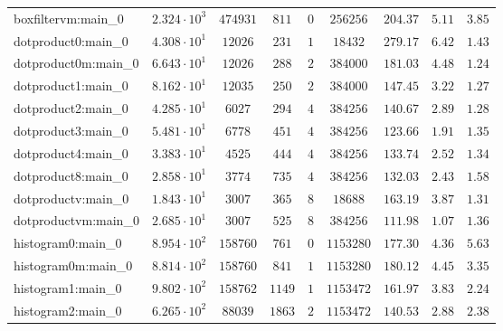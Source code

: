 \begin{tabular}{|l|c|c|c|c|c|c|c|c|}
boxfiltervm:main\_0            & $ 2.324 \cdot 10^{3} $ & $ 474931   $ & $ 811    $ & $ 0    $ & $ 256256   $ & $ 204.37      $ & $ 5.11    $ & $ 3.85    $ \\
dotproduct0:main\_0            & $ 4.308 \cdot 10^{1} $ & $ 12026    $ & $ 231    $ & $ 1    $ & $ 18432    $ & $ 279.17      $ & $ 6.42    $ & $ 1.43    $ \\
dotproduct0m:main\_0           & $ 6.643 \cdot 10^{1} $ & $ 12026    $ & $ 288    $ & $ 2    $ & $ 384000   $ & $ 181.03      $ & $ 4.48    $ & $ 1.24    $ \\
dotproduct1:main\_0            & $ 8.162 \cdot 10^{1} $ & $ 12035    $ & $ 250    $ & $ 2    $ & $ 384000   $ & $ 147.45      $ & $ 3.22    $ & $ 1.27    $ \\
dotproduct2:main\_0            & $ 4.285 \cdot 10^{1} $ & $ 6027     $ & $ 294    $ & $ 4    $ & $ 384256   $ & $ 140.67      $ & $ 2.89    $ & $ 1.28    $ \\
dotproduct3:main\_0            & $ 5.481 \cdot 10^{1} $ & $ 6778     $ & $ 451    $ & $ 4    $ & $ 384256   $ & $ 123.66      $ & $ 1.91    $ & $ 1.35    $ \\
dotproduct4:main\_0            & $ 3.383 \cdot 10^{1} $ & $ 4525     $ & $ 444    $ & $ 4    $ & $ 384256   $ & $ 133.74      $ & $ 2.52    $ & $ 1.34    $ \\
dotproduct8:main\_0            & $ 2.858 \cdot 10^{1} $ & $ 3774     $ & $ 735    $ & $ 4    $ & $ 384256   $ & $ 132.03      $ & $ 2.43    $ & $ 1.58    $ \\
dotproductv:main\_0            & $ 1.843 \cdot 10^{1} $ & $ 3007     $ & $ 365    $ & $ 8    $ & $ 18688    $ & $ 163.19      $ & $ 3.87    $ & $ 1.31    $ \\
dotproductvm:main\_0           & $ 2.685 \cdot 10^{1} $ & $ 3007     $ & $ 525    $ & $ 8    $ & $ 384256   $ & $ 111.98      $ & $ 1.07    $ & $ 1.36    $ \\
histogram0:main\_0             & $ 8.954 \cdot 10^{2} $ & $ 158760   $ & $ 761    $ & $ 0    $ & $ 1153280  $ & $ 177.30      $ & $ 4.36    $ & $ 5.63    $ \\
histogram0m:main\_0            & $ 8.814 \cdot 10^{2} $ & $ 158760   $ & $ 841    $ & $ 1    $ & $ 1153280  $ & $ 180.12      $ & $ 4.45    $ & $ 3.35    $ \\
histogram1:main\_0             & $ 9.802 \cdot 10^{2} $ & $ 158762   $ & $ 1149   $ & $ 1    $ & $ 1153472  $ & $ 161.97      $ & $ 3.83    $ & $ 2.24    $ \\
histogram2:main\_0             & $ 6.265 \cdot 10^{2} $ & $ 88039    $ & $ 1863   $ & $ 2    $ & $ 1153472  $ & $ 140.53      $ & $ 2.88    $ & $ 2.38    $ \\

\end{tabular}
